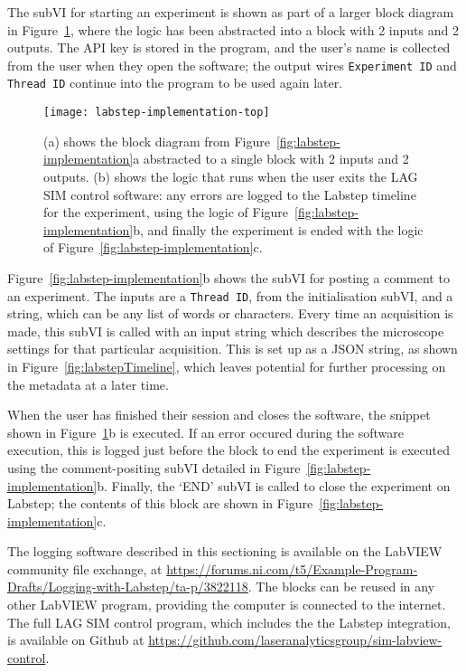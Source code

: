 The subVI for starting an experiment is shown as part of a larger block diagram in Figure~\ref{fig:labstep-implementation-top}, where the logic has been abstracted into a block with 2 inputs and 2 outputs. 
The API key is stored in the program, and the user's name is collected from the user when they open the software; the output wires \texttt{Experiment ID} and \texttt{Thread ID} continue into the program to be used again later. 

\begin{figure}[tbp]
\centering
\texttt{[image: labstep-implementation-top]}
\caption[Top level functions for uploading to Labstep]{(a) shows the block diagram from Figure~\ref{fig:labstep-implementation}a abstracted to a single block with 2 inputs and 2 outputs. (b) shows the logic that runs when the user exits the LAG SIM control software: any errors are logged to the Labstep timeline for the experiment, using the logic of Figure~\ref{fig:labstep-implementation}b, and finally the experiment is ended with the logic of Figure~\ref{fig:labstep-implementation}c. } 
\label{fig:labstep-implementation-top}
\end{figure}

Figure~\ref{fig:labstep-implementation}b shows the subVI for posting a comment to an experiment.
The inputs are a \texttt{Thread ID}, from the initialisation subVI, and a string, which can be any list of words or characters.
Every time an acquisition is made, this subVI is called with an input string which describes the microscope settings for that particular acquisition. 
This is set up as a JSON string, as shown in Figure~\ref{fig:labstepTimeline}, which leaves potential for further processing on the metadata at a later time. 

When the user has finished their session and closes the software, the snippet shown in Figure~\ref{fig:labstep-implementation-top}b is executed. 
If an error occured during the software execution, this is logged just before the block to end the experiment is executed using the comment-positing subVI detailed in Figure~\ref{fig:labstep-implementation}b. 
Finally, the `END' subVI is called to close the experiment on Labstep; the contents of this block are shown in Figure~\ref{fig:labstep-implementation}c. 

The logging software described in this sectioning is available on the LabVIEW community file exchange, at \url{https://forums.ni.com/t5/Example-Program-Drafts/Logging-with-Labstep/ta-p/3822118}. 
The blocks can be reused in any other LabVIEW program, providing the computer is connected to the internet. 
The full LAG SIM control program, which includes the the Labstep integration, is available on Github at \url{https://github.com/laseranalyticsgroup/sim-labview-control}. 

